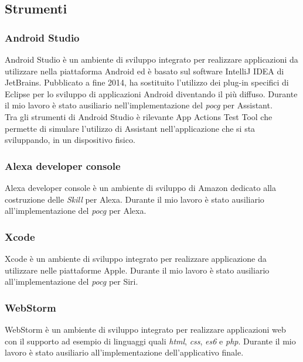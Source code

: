 	\subsection{Strumenti}
		\subsubsection{Android Studio}
		Android Studio è un ambiente di sviluppo integrato per realizzare applicazioni da utilizzare nella piattaforma Android ed è basato sul software IntelliJ IDEA di JetBrains. Pubblicato a fine 2014, ha sostituito l'utilizzo dei plug-in specifici di Eclipse per lo sviluppo di applicazioni Android diventando il più diffuso. Durante il mio lavoro è stato ausiliario nell'implementazione del \emph{\gls{pocg}} per Assistant. \\
		Tra gli strumenti di Android Studio è rilevante App Actions Test Tool che permette di simulare l'utilizzo di Assistant nell'applicazione che si sta sviluppando, in un dispositivo fisico.
		\subsubsection{Alexa developer console}
		Alexa developer console è un ambiente di sviluppo di Amazon dedicato alla costruzione delle \emph{Skill} per Alexa. Durante il mio lavoro è stato ausiliario all'implementazione del \emph{\gls{pocg}} per Alexa.
		\subsubsection{Xcode}
		Xcode è un ambiente di sviluppo integrato per realizzare applicazione da utilizzare nelle piattaforme Apple. Durante il mio lavoro è stato ausiliario all'implementazione del \emph{\gls{pocg}} per Siri.
		\subsubsection{WebStorm}
		WebStorm è un ambiente di sviluppo integrato per realizzare applicazioni web con il supporto ad esempio di linguaggi quali \emph{\gls{html}}, \emph{\gls{css}}, \emph{\gls{es6}} e \emph{\gls{php}}\glsfirstoccur. Durante il mio lavoro è stato ausiliario all'implementazione dell'applicativo finale.

